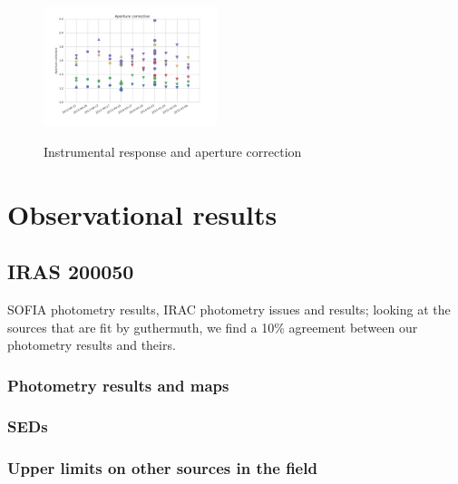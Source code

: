 \begin{figure}
\begin{center}
\includegraphics[width=0.45\textwidth]{Figures/Aper_corr.png}
\label{fig:aper_corr}

\caption{Instrumental response and aperture correction}
\end{center}
\end{figure}

\section{Observational results}
\subsection{IRAS 200050}

SOFIA photometry results, IRAC photometry issues and results; looking at the sources that are fit by guthermuth, we find a 10\% agreement between our photometry results and theirs.

\subsubsection{Photometry results and maps}

\subsubsection{SEDs}


\subsubsection{Upper limits on other sources in the field}

